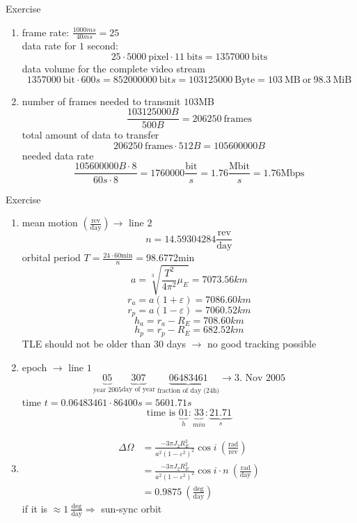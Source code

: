 \documentclass[a4paper,10pt]{article}
\begin{document}
\setcounter{section}{7}
\begin{section}{Exercise}
\setcounter{subsection}{1}
 \begin{subsection}{}
  \begin{enumerate}[1)]
   \item frame rate: $\frac{1000ms}{40ms} = 25$ \\
   data rate for $1$ second: \[ 25\cdot 5000 ~\text{pixel} \cdot 11 ~\text{bits} = 1357000~\text{bits}\]
   data volume for the complete video stream
   \[ 1357000~\text{bit} \cdot 600s = 852000000~\text{bit}s = 103125000~\text{Byte}= 103~\text{MB} ~\text{or}~ 98.3 ~\text{MiB}\]
   \item number of frames needed to transmit $103$MB
   \[ \frac{103125000B}{500B} = 206250 ~\text{frames}\]
   total amount of data to transfer
   \[ 206250~\text{frames}\cdot 512B = 105600000B \]
   needed data rate
   \[ \frac{105600000B\cdot 8}{60s\cdot 8} = 1760000\frac{\text{bit}}{s} = 1.76\frac{\text{Mbit}}{s} = 1.76\text{Mbps}\]
  \end{enumerate}
 \end{subsection}
\end{section}
\begin{section}{Exercise}
 \begin{subsection}{}
  \begin{enumerate}[1)]
   \item mean motion $\left(\frac{\text{rev}}{\text{day}}\right) \rightarrow$ line $2$
   \[ n = 14.59304284 \frac{\text{rev}}{\text{day}}\]
   orbital period $T=\frac{24\cdot 60\text{min}}{n} = 98.6772\text{min}$
   \[ a = \sqrt[3]{\frac{T^2}{4\pi^2} \mu_E} = 7073.56km \]
   \[ r_a = a(1+\varepsilon) = 7086.60km \]
   \[ r_p = a(1-\varepsilon) = 7060.52km \]
   \[ h_a = r_a - R_E = 708.60km \]
   \[ h_p = r_p - R_E = 682.52km \]
   TLE should not be older than $30$ days $\rightarrow$ no good tracking possible
   \item epoch $\rightarrow$ line $1$
   \[ \underbrace{05}_{\text{year }2005}\underbrace{307}_{\text{day of year}}~\underbrace{06483461}_{\text{fraction of day (24h)}} \rightarrow \text{3. Nov 2005}\]
   time $t= 0.06483461 \cdot 86400s = 5601.71s$
   \[ \text{time is } \underbrace{01}_{h}:\underbrace{33}_{min}:\underbrace{21.71}_{s}\]
   \item \begin{align*} 
	    \Delta\Omega &= \frac{-3\pi J_2 R_E^2}{a^2(1-\varepsilon^2)^2}\cos i ~\left(\frac{\text{rad}}{\text{rev}}\right) \\
	    &= \frac{-3\pi J_2 R_E^2}{a^2(1-\varepsilon^2)^2}\cos i \cdot n~\left(\frac{\text{rad}}{\text{day}}\right) \\
	    &= 0.9875~\left(\frac{\text{deg}}{\text{day}}\right)
         \end{align*}
  if it is $\approx 1 ~\frac{\text{deg}}{\text{day}} \Rightarrow$ sun-sync orbit
  \end{enumerate}

 \end{subsection}

\end{section}
\end{document}
